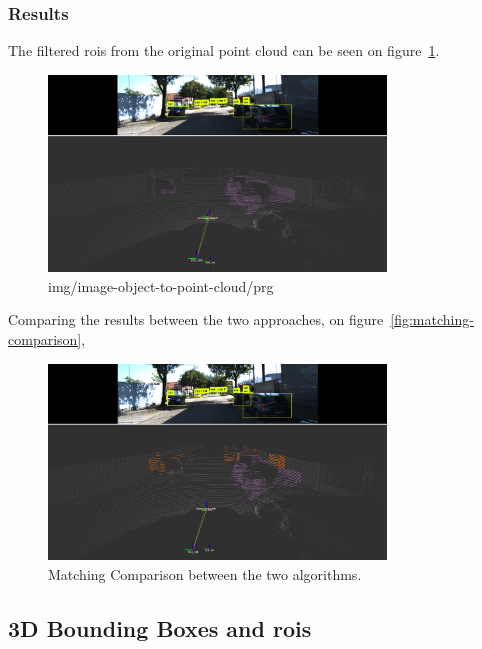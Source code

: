 \subsubsection{Results}
The filtered \acp{roi} from the original point cloud can be seen on figure~\ref{fig:projected-correspondences}.

\begin{figure}[H]
	\centering
	\includegraphics[width=0.8\textwidth]{img/image-object-to-point-cloud/projected_correspondences.png}
	\caption{img/image-object-to-point-cloud/prg}
	\label{fig:projected-correspondences}
\end{figure}

Comparing the results between the two approaches, on figure~\ref{fig:matching-comparison}, 

\begin{figure}[H]
	\centering
	\includegraphics[width=0.8\textwidth]{img/image-object-to-point-cloud/rois-comparison.png}
	\caption{Matching Comparison between the two algorithms.}
	\label{fig:rois-matching-comparison}
\end{figure}

\subsection{3D Bounding Boxes and \aclp{roi}}

